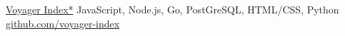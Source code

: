 \showoff
{\href{voyager-index.herokuapp.com}{Voyager Index*}}
{}
{JavaScript, Node.js, Go, PostGreSQL, HTML/CSS, Python}
{\href{https://github.com/voyager-index/}{github.com/voyager-index}}


\myBreak

